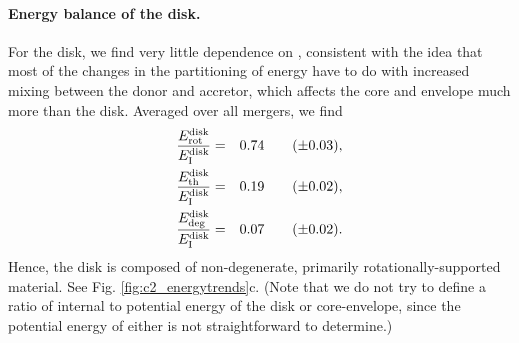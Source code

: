 \paragraph{Energy balance of the disk.} For the disk, we find very little dependence on \qrho, consistent with the idea that most of the changes in the partitioning of energy have to do with increased mixing between the donor and accretor, which affects the core and envelope much more than the disk.  Averaged over all mergers, we find
\begin{eqnarray}
\frac{E^\mathrm{disk}_\mathrm{rot}}{E^\mathrm{disk}_\mathrm{I}} &=& 0.74
\qquad(\pm0.03),\\
\frac{E^\mathrm{disk}_\mathrm{th}}{E^\mathrm{disk}_\mathrm{I}} &=& 0.19
\qquad(\pm0.02),\\
\frac{E^\mathrm{disk}_\mathrm{deg}}{E^\mathrm{disk}_\mathrm{I}} &=& 0.07
\qquad(\pm0.02).
\end{eqnarray}
Hence, the disk is composed of non-degenerate, primarily rotationally-supported material.  See Fig. \ref{fig:c2_energytrends}c.  (Note that we do not try to define a ratio of internal to potential energy of the disk or core-envelope, since the potential energy of either is not straightforward to determine.)

